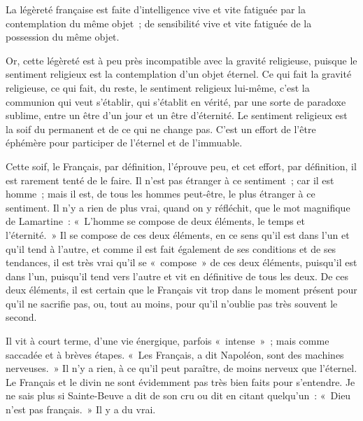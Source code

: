 \documentclass[french,twoside]{book} %
\newcommand{\astertri}{\medskip\par\centerline{\color{rubric}\large\selectfont{\syms ✻\,✻\,✻}}\medskip\par}%
\begin{document}
La légèreté française est faite d’intelligence vive et vite fatiguée par la contemplation du même  objet ; de sensibilité vive et vite fatiguée de la possession du même objet.\par
Or, cette légèreté est à peu près incompatible avec la gravité religieuse, puisque le sentiment religieux est la contemplation d’un objet éternel. Ce qui fait la gravité religieuse, ce qui fait, du reste, le sentiment religieux lui-même, c’est la communion qui veut s’établir, qui s’établit en vérité, par une sorte de paradoxe sublime, entre un être d’un jour et un être d’éternité. Le sentiment religieux est la soif du permanent et de ce qui ne change pas. C’est un effort de l’être éphémère pour participer de l’éternel et de l’immuable.\par
Cette soif, le Français, par définition, l’éprouve peu, et cet effort, par définition, il est rarement tenté de le faire. Il n’est pas étranger à ce sentiment ; car il est homme ; mais il est, de tous les hommes peut-être, le plus étranger à ce sentiment. Il n’y a rien de plus vrai, quand on y réfléchit, que le mot magnifique de Lamartine : « L’homme se compose de deux éléments, le temps et l’éternité. » Il se compose de ces deux éléments, en ce sens qu’il est dans l’un et qu’il tend à l’autre, et comme il est fait également de ses conditions et de ses tendances, il est très vrai qu’il se « compose » de ces deux éléments, puisqu’il est dans l’un, puisqu’il  tend vers l’autre et vit en définitive de tous les deux. De ces deux éléments, il est certain que le Français vit trop dans le moment présent pour qu’il ne sacrifie pas, ou, tout au moins, pour qu’il n’oublie pas très souvent le second.\par
Il vit à court terme, d’une vie énergique, parfois « intense » ; mais comme saccadée et à brèves étapes. « Les Français, a dit Napoléon, sont des machines nerveuses. » Il n’y a rien, à ce qu’il peut paraître, de moins nerveux que l’éternel. Le Français et le divin ne sont évidemment pas très bien faits pour s’entendre. Je ne sais plus si Sainte-Beuve a dit de son cru ou dit en citant quelqu’un : « Dieu n’est pas français. » Il y a du vrai.\par

\astertri
\end{document}
